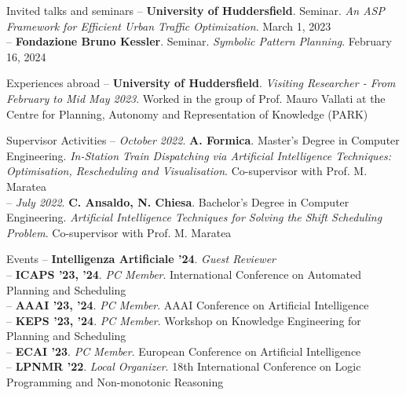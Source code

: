 \documentclass{resume} %
\begin{document}
\begin{rSection}{Invited talks and seminars}
-- \textbf{University of Huddersfield}. Seminar. \textit{An ASP Framework for Efficient Urban Traffic Optimization}. March 1, 2023\\
-- \textbf{Fondazione Bruno Kessler}. Seminar. \textit{Symbolic Pattern Planning}. February 16, 2024
\end{rSection}

\begin{rSection}{Experiences abroad}
-- \textbf{University of Huddersfield}. \textit{Visiting Researcher - From February to Mid May 2023}. Worked in the group of Prof. Mauro Vallati at the Centre for Planning, Autonomy and Representation of Knowledge (PARK)  
\end{rSection}

\begin{rSection}{Supervisor Activities}
-- \textit{October 2022}. \textbf{A. Formica}. Master's Degree in Computer Engineering. \textit{In-Station Train Dispatching via Artificial Intelligence Techniques: Optimisation, Rescheduling and Visualisation}. Co-supervisor with Prof. M. Maratea\\
-- \textit{July 2022}. \textbf{C. Ansaldo, N. Chiesa}. Bachelor's Degree in Computer Engineering. \textit{Artificial Intelligence Techniques for Solving the Shift Scheduling Problem}. Co-supervisor with Prof. M. Maratea
\end{rSection}

\break

\begin{rSection}{Events}
-- \textbf{Intelligenza Artificiale '24}. \textit{Guest Reviewer} \\
-- \textbf{ICAPS '23, '24}. \textit{PC Member}. International Conference on Automated Planning and Scheduling \\
-- \textbf{AAAI '23, '24}. \textit{PC Member}. AAAI Conference on Artificial Intelligence \\
-- \textbf{KEPS '23, '24}. \textit{PC Member}. Workshop on Knowledge Engineering for Planning and Scheduling \\
-- \textbf{ECAI '23}. \textit{PC Member}. European Conference on Artificial Intelligence \\
-- \textbf{LPNMR '22}. \textit{Local Organizer}. 18th International Conference on Logic Programming and Non-monotonic Reasoning  
\end{rSection}
\end{document}
